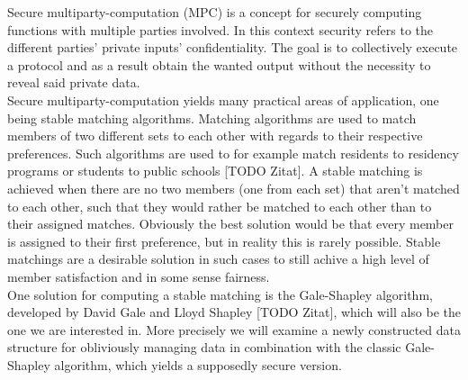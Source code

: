 Secure multiparty-computation (MPC) is a concept for securely computing functions with multiple parties involved. In this context security refers to the different parties' private inputs' confidentiality. The goal is to collectively execute a protocol and as a result obtain the wanted output without the necessity to reveal said private data. \\
Secure multiparty-computation yields many practical areas of application, one being stable matching algorithms. Matching algorithms are used to match members of two different sets to each other with regards to their respective preferences. Such algorithms are used to for example match residents to residency programs or students to public schools [TODO Zitat]. A stable matching is achieved when there are no two members (one from each set) that aren't matched to each other, such that they would rather be matched to each other than to their assigned matches. Obviously the best solution would be that every member is assigned to their first preference, but in reality this is rarely possible. Stable matchings are a desirable solution in such cases to still achive a high level of member satisfaction and in some sense fairness.\\
One solution for computing a stable matching is the Gale-Shapley algorithm, developed by David Gale and Lloyd Shapley [TODO Zitat], which will also be the one we are interested in. More precisely we will examine a newly constructed data structure for obliviously managing data in combination with the classic Gale-Shapley algorithm, which yields a supposedly secure version.